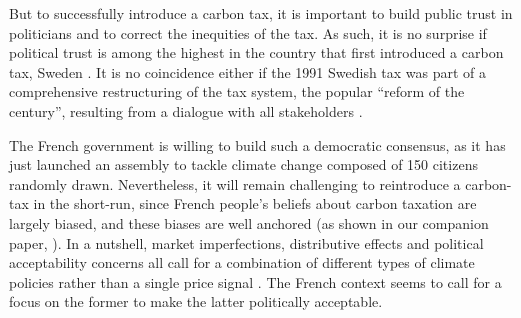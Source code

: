 \documentclass[english,5p,authoryear]{elsarticle}
\begin{document}
But to successfully introduce a carbon tax, it is important to build public trust in politicians \citep{harring_jagers_2013,rafaty_perceptions_2018} and to correct the inequities of the tax. As such, it is no surprise if political trust is among the highest in the country that first introduced a carbon tax, Sweden \citep{klenert_making_2018}. It is no coincidence either if the 1991 Swedish tax was part of a comprehensive restructuring of the tax system, the popular ``reform of the century'', resulting from a dialogue with all stakeholders \citep{sterner_environmental_2014}. 

The French government is willing to build such a democratic consensus, as it has just launched an assembly to tackle climate change composed of 150 citizens randomly drawn. Nevertheless, it will remain challenging to reintroduce a carbon-tax in the short-run, since French people's beliefs about carbon taxation are largely biased, and these biases are well anchored (as shown in our companion paper, \citealt{douenne_can_2019}). In a nutshell, market imperfections, distributive effects and political acceptability concerns all call for a combination of different types of climate policies rather than a single price signal \citep{stern_report_2017,stiglitz_addressing_2019}. The French context seems to call for a focus on the former to make the latter politically acceptable. 


\end{document}
